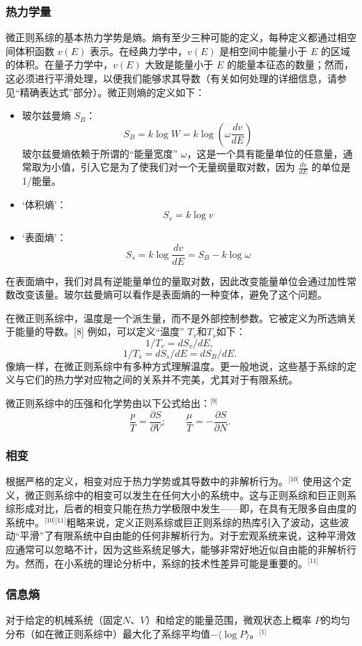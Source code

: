 \subsubsection{热力学量}  
微正则系综的基本热力学势是熵。熵有至少三种可能的定义，每种定义都通过相空间体积函数 \( v(E) \) 表示。在经典力学中，\( v(E) \) 是相空间中能量小于 \( E \) 的区域的体积。在量子力学中，\( v(E) \) 大致是能量小于 \( E \) 的能量本征态的数量；然而，这必须进行平滑处理，以便我们能够求其导数（有关如何处理的详细信息，请参见“精确表达式”部分）。微正则熵的定义如下：
\begin{itemize}
\item 玻尔兹曼熵 \( S_B \)：
\[
S_B = k \log W = k \log \left( \omega \frac{dv}{dE} \right)~
\]
玻尔兹曼熵依赖于所谓的“能量宽度” \( \omega \)，这是一个具有能量单位的任意量，通常取为小值，引入它是为了使我们对一个无量纲量取对数，因为 \( \frac{dv}{dE} \) 的单位是 1/能量。
\item ‘体积熵’：
\[
S_v = k \log v~
\]
\item ‘表面熵’：
\[
S_s = k \log \frac{dv}{dE} = S_B - k \log \omega~
\]
\end{itemize}
在表面熵中，我们对具有逆能量单位的量取对数，因此改变能量单位会通过加性常数改变该量。玻尔兹曼熵可以看作是表面熵的一种变体，避免了这个问题。

在微正则系综中，温度是一个派生量，而不是外部控制参数。它被定义为所选熵关于能量的导数。[8] 例如，可以定义“温度” \( T_v \)和\( T_s \)如下：
\[
1/T_v= dS_v/dE,~
\]
\[
1/T_s= dS_s/dE=dS_B/dE.~
\]
像熵一样，在微正则系综中有多种方式理解温度。更一般地说，这些基于系综的定义与它们的热力学对应物之间的关系并不完美，尤其对于有限系统。

微正则系综中的压强和化学势由以下公式给出：\(^\text{[9]}\)
\[
\frac{p}{T} = \frac{\partial S}{\partial V}; \qquad \frac{\mu}{T} = -\frac{\partial S}{\partial N}.~
\]
\subsubsection{相变}  
根据严格的定义，相变对应于热力学势或其导数中的非解析行为。\(^\text{[10]}\) 使用这个定义，微正则系综中的相变可以发生在任何大小的系统中。这与正则系综和巨正则系综形成对比，后者的相变只能在热力学极限中发生——即，在具有无限多自由度的系统中。\(^\text{[10][11]}\)粗略来说，定义正则系综或巨正则系综的热库引入了波动，这些波动“平滑”了有限系统中自由能的任何非解析行为。对于宏观系统来说，这种平滑效应通常可以忽略不计，因为这些系统足够大，能够非常好地近似自由能的非解析行为。然而，在小系统的理论分析中，系综的技术性差异可能是重要的。\(^\text{[11]}\)
\subsubsection{信息熵}  
对于给定的机械系统（固定\( N \)、\( V \)）和给定的能量范围，微观状态上概率 \( P \)的均匀分布（如在微正则系综中）最大化了系综平均值\( -\langle \log P \rangle \)。\(^\text{[1]}\)
